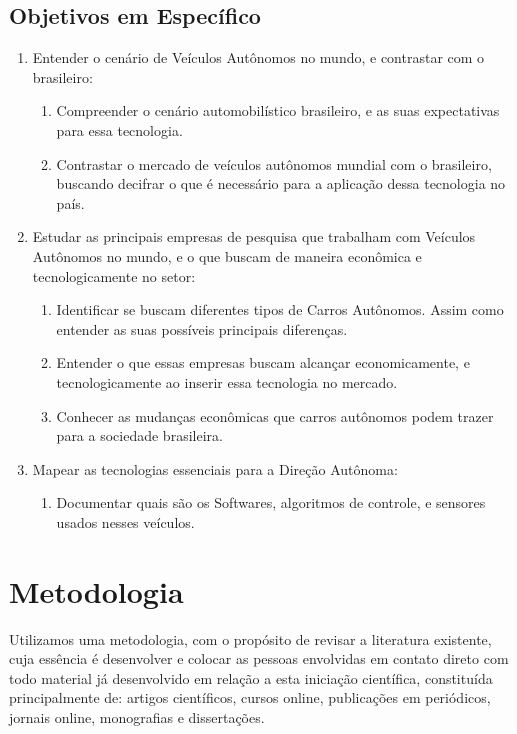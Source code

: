 \section{Objetivos em Específico}\label{Objetivos Específicos}
\begin{enumerate}
    \item  Entender o cenário de Veículos Autônomos no mundo, e contrastar com o brasileiro:
    \begin{enumerate}
        \item Compreender o cenário automobilístico brasileiro, e as suas expectativas para essa tecnologia.
        \item Contrastar o mercado de veículos autônomos mundial com o brasileiro, buscando decifrar o que é necessário para a aplicação dessa tecnologia no país.
    \end{enumerate}
    \item Estudar as principais empresas de pesquisa que trabalham com Veículos Autônomos no mundo, e o que buscam de maneira econômica e tecnologicamente no setor:
    \begin{enumerate}
        \item Identificar se buscam diferentes tipos de Carros Autônomos. Assim como entender as suas possíveis principais diferenças.
        \item Entender o que essas empresas buscam alcançar economicamente, e tecnologicamente ao inserir essa tecnologia no mercado.
        \item Conhecer as mudanças econômicas que carros autônomos podem trazer para a sociedade brasileira. 
    \end{enumerate}
    \item Mapear as tecnologias essenciais para a Direção Autônoma:
    \begin{enumerate}
        \item Documentar quais são os Softwares, algoritmos de controle, e sensores usados nesses veículos.  
    \end{enumerate}
\end{enumerate}

\newpage
\chapter{Metodologia} \label{Metodologia}
Utilizamos uma metodologia, com o propósito de revisar a literatura existente, cuja essência é desenvolver e colocar as pessoas envolvidas em contato direto com todo material já desenvolvido em relação a esta iniciação científica, constituída principalmente de: artigos científicos, cursos online, publicações em periódicos, jornais online, monografias e dissertações.

